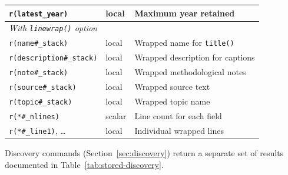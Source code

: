 \documentclass[bib]{statapress}
\begin{document}
\begin{table}[H]
\begin{tabular}{llp{6.5cm}}
\texttt{r(latest\_year)} & local & Maximum year retained \\
\hline
\multicolumn{3}{l}{\textit{With \texttt{linewrap()} option}} \\
\texttt{r(name\#\_stack)} & local & Wrapped name for \texttt{title()} \\
\texttt{r(description\#\_stack)} & local & Wrapped description for captions \\
\texttt{r(note\#\_stack)} & local & Wrapped methodological notes \\
\texttt{r(source\#\_stack)} & local & Wrapped source text \\
\texttt{r(topic\#\_stack)} & local & Wrapped topic name \\
\texttt{r(*\#\_nlines)} & scalar & Line count for each field \\
\texttt{r(*\#\_line1)}, \ldots & local & Individual wrapped lines \\
\hline
\end{tabular}
\end{table}

Discovery commands (Section~\ref{sec:discovery}) return a separate set of
results documented in Table~\ref{tab:stored-discovery}.
\end{document}
